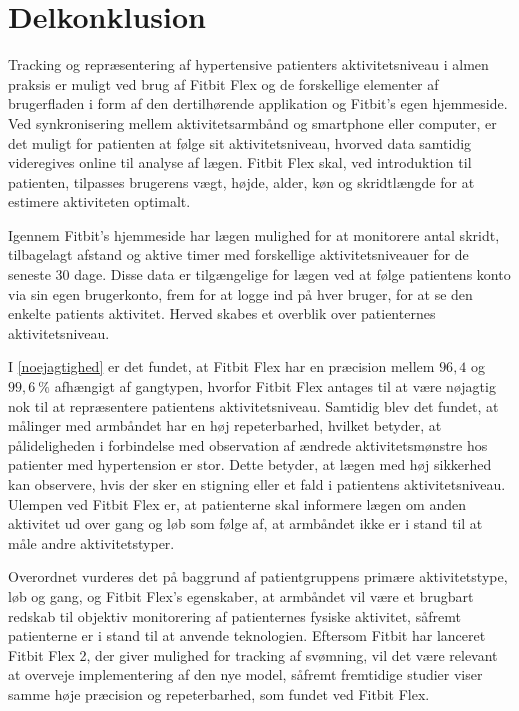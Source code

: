 \section{Delkonklusion}

Tracking og repræsentering af hypertensive patienters aktivitetsniveau i almen praksis er muligt ved brug af Fitbit Flex og de forskellige elementer af brugerfladen i form af den dertilhørende applikation og Fitbit's egen hjemmeside. Ved synkronisering mellem aktivitetsarmbånd og smartphone eller computer, er  det muligt for patienten at følge sit aktivitetsniveau, hvorved data samtidig videregives online til analyse af lægen. Fitbit Flex skal, ved introduktion til patienten, tilpasses brugerens vægt, højde, alder, køn og skridtlængde for at estimere aktiviteten optimalt.

Igennem Fitbit's hjemmeside har lægen mulighed for at monitorere antal skridt, tilbagelagt afstand og aktive timer med forskellige aktivitetsniveauer for de seneste $30$ dage. Disse data er tilgængelige for lægen ved at følge patientens konto via sin egen brugerkonto, frem for at logge ind på hver bruger, for at se den enkelte patients aktivitet. Herved skabes et overblik over patienternes aktivitetsniveau. 

I \autoref{noejagtighed} er det fundet, at Fitbit Flex har en præcision mellem $96,4$ og $99,6~\%$ afhængigt af gangtypen, hvorfor Fitbit Flex antages til at være nøjagtig nok til at repræsentere  patientens aktivitetsniveau. Samtidig blev det fundet, at målinger med armbåndet har en høj repeterbarhed, hvilket betyder, at pålideligheden i forbindelse med observation af ændrede aktivitetsmønstre hos patienter med hypertension er stor. Dette  betyder, at lægen med høj sikkerhed kan observere, hvis der sker en stigning eller et fald i patientens aktivitetsniveau. 
Ulempen ved Fitbit Flex er, at patienterne skal informere lægen om anden aktivitet ud over gang og løb som følge af, at armbåndet ikke er i stand til at måle andre aktivitetstyper.

Overordnet vurderes det på baggrund af patientgruppens primære aktivitetstype, løb og gang, og Fitbit Flex's egenskaber, at armbåndet vil være et brugbart redskab til objektiv monitorering af patienternes fysiske aktivitet, såfremt patienterne er i stand til at anvende teknologien. Eftersom Fitbit har lanceret Fitbit Flex 2, der giver mulighed for tracking af svømning, vil det være relevant at overveje implementering af den nye model, såfremt fremtidige studier viser samme høje præcision og repeterbarhed, som fundet ved Fitbit Flex.